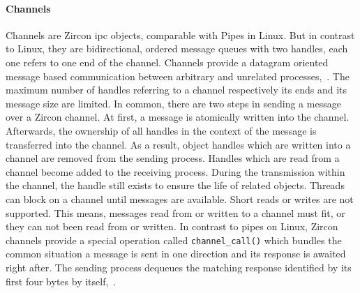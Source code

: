 %

\paragraph{Channels}
Channels are Zircon \ac{ipc} objects, comparable with Pipes in Linux.
But in contrast to Linux, they are bidirectional, ordered message queues with two handles, each one refers to one end of the channel.
Channels provide a datagram oriented message based communication between arbitrary and unrelated processes\cite{zircon-channel},~\cite{zircon-concepts}.
The maximum number of handles referring to a channel respectively its ends and its message size are limited.
In common, there are two steps in sending a message over a Zircon channel.
At first, a message is atomically written into the channel.
Afterwards, the ownership of all handles in the context of the message is transferred into the channel\cite{zircon-channel}.
As a result, object handles which are written into a channel are removed from the sending process.
Handles which are read from a channel become added to the receiving process.
During the transmission within the channel, the handle still exists to ensure the life of related objects\cite{zircon-concepts}.
Threads can block on a channel until messages are available.
Short reads or writes are not supported.
This means, messages read from or written to a channel must fit, or they can not been read from or written.
In contrast to pipes on Linux, Zircon channels provide a special operation called \texttt{channel\_call()} which bundles the common situation a message is sent in one direction and its response is awaited right after.
The sending process dequeues the matching response identified by its first four bytes by itself\cite{zircon-concepts},~\cite{zircon-channel}.

